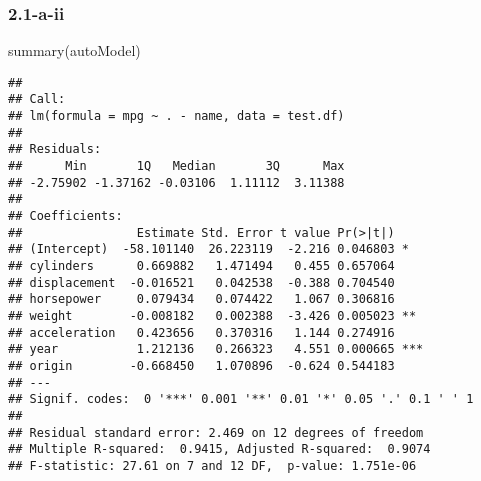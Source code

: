 \documentclass[
]{article}
\newenvironment{Shaded}{\begin{snugshade}}{\end{snugshade}}
\newcommand{\AttributeTok}[1]{\textcolor[rgb]{0.77,0.63,0.00}{#1}}
\newcommand{\CommentTok}[1]{\textcolor[rgb]{0.56,0.35,0.01}{\textit{#1}}}
\newcommand{\DecValTok}[1]{\textcolor[rgb]{0.00,0.00,0.81}{#1}}
\newcommand{\FunctionTok}[1]{\textcolor[rgb]{0.00,0.00,0.00}{#1}}
\newcommand{\NormalTok}[1]{#1}
\newcommand{\OtherTok}[1]{\textcolor[rgb]{0.56,0.35,0.01}{#1}}
\newcommand{\SpecialCharTok}[1]{\textcolor[rgb]{0.00,0.00,0.00}{#1}}
\begin{document}
\hypertarget{a-ii}{%
\subsubsection{2.1-a-ii}\label{a-ii}}

\begin{Shaded}
\begin{Highlighting}[]
\FunctionTok{summary}\NormalTok{(autoModel)}
\end{Highlighting}
\end{Shaded}

\begin{verbatim}
## 
## Call:
## lm(formula = mpg ~ . - name, data = test.df)
## 
## Residuals:
##      Min       1Q   Median       3Q      Max 
## -2.75902 -1.37162 -0.03106  1.11112  3.11388 
## 
## Coefficients:
##                Estimate Std. Error t value Pr(>|t|)    
## (Intercept)  -58.101140  26.223119  -2.216 0.046803 *  
## cylinders      0.669882   1.471494   0.455 0.657064    
## displacement  -0.016521   0.042538  -0.388 0.704540    
## horsepower     0.079434   0.074422   1.067 0.306816    
## weight        -0.008182   0.002388  -3.426 0.005023 ** 
## acceleration   0.423656   0.370316   1.144 0.274916    
## year           1.212136   0.266323   4.551 0.000665 ***
## origin        -0.668450   1.070896  -0.624 0.544183    
## ---
## Signif. codes:  0 '***' 0.001 '**' 0.01 '*' 0.05 '.' 0.1 ' ' 1
## 
## Residual standard error: 2.469 on 12 degrees of freedom
## Multiple R-squared:  0.9415, Adjusted R-squared:  0.9074 
## F-statistic: 27.61 on 7 and 12 DF,  p-value: 1.751e-06
\end{verbatim}

\begin{Shaded}
\end{Shaded}
\end{document}
